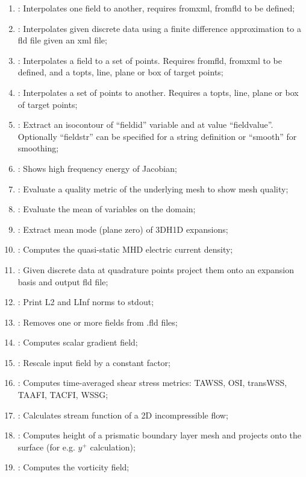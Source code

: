 \begin{enumerate}
\item {}: Interpolates one field to another, requires fromxml, fromfld to be defined;
\item {}: Interpolates given discrete data using a finite difference approximation to a fld file given an xml file;
\item {}: Interpolates a field to a set of points. Requires fromfld, fromxml to be defined, and a topts, line, plane or box of target points;
\item {}: Interpolates a set of points to another. Requires a topts, line, plane or box of target points;
\item {}: Extract an isocontour of ``fieldid'' variable and at value ``fieldvalue''. Optionally ``fieldstr'' can be specified for a string definition or ``smooth'' for smoothing;
\item {}: Shows high frequency energy of Jacobian;
\item {}: Evaluate a quality metric of the underlying mesh to show mesh quality;
\item {}: Evaluate the mean of variables on the domain;
\item {}: Extract mean mode (plane zero) of 3DH1D expansions;
\item {}: Computes the quasi-static MHD electric current density;
\item {}: Given discrete data at quadrature points
  project them onto an expansion basis and output fld file;
\item {}: Print L2 and LInf norms to stdout;
\item {}: Removes one or more fields from .fld files;
\item {}: Computes scalar gradient field;
\item {}: Rescale input field by a constant factor;
\item {}: Computes time-averaged shear stress metrics: TAWSS, OSI, transWSS, TAAFI, TACFI, WSSG;
\item {}: Calculates stream function of a 2D incompressible flow;
\item {}: Computes height of a prismatic boundary layer mesh and projects onto the surface (for e.g. $y^+$ calculation);
\item {}: Computes the vorticity field;

\end{enumerate}
